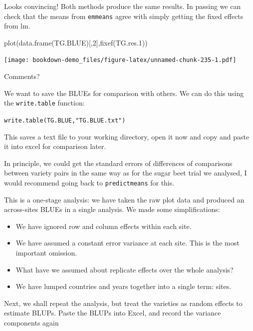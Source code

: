 \documentclass[
]{book}
\newenvironment{Shaded}{\begin{snugshade}}{\end{snugshade}}
\newcommand{\DecValTok}[1]{\textcolor[rgb]{0.00,0.00,0.81}{#1}}
\newcommand{\FloatTok}[1]{\textcolor[rgb]{0.00,0.00,0.81}{#1}}
\newcommand{\FunctionTok}[1]{\textcolor[rgb]{0.00,0.00,0.00}{#1}}
\newcommand{\NormalTok}[1]{#1}
\begin{document}
Looks convincing! Both methods produce the same results. In passing we can check that the means from \texttt{emmeans} agree with simply getting the fixed effects from lm.

\begin{Shaded}
\begin{Highlighting}[]
\FunctionTok{plot}\NormalTok{(}\FunctionTok{data.frame}\NormalTok{(TG.BLUE)[,}\DecValTok{2}\NormalTok{],}\FunctionTok{fixef}\NormalTok{(TG.res}\FloatTok{.1}\NormalTok{))}
\end{Highlighting}
\end{Shaded}

\texttt{[image: bookdown-demo\_files/figure-latex/unnamed-chunk-235-1.pdf]}

Comments?

We want to save the BLUEs for comparison with others. We can do this using the \texttt{write.table} function:

\texttt{write.table(TG.BLUE,"TG.BLUE.txt")}

This saves a text file to your working directory, open it now and copy and paste it into excel for comparison later.

In principle, we could get the standard errors of differences of comparisons between variety pairs in the same way as for the sugar beet trial we analysed, I would recommend going back to \texttt{predictmeans} for this.

This is a one-stage analysis: we have taken the raw plot data and produced an across-sites BLUEs in a single analysis. We made some simplifications:

\begin{itemize}
\item
  We have ignored row and column effects within each site.
\item
  We have assumed a constant error variance at each site. This is the most important omission.
\item
  What have we assumed about replicate effects over the whole analysis?
\item
  We have lumped countries and years together into a single term: sites.
\end{itemize}

Next, we shall repeat the analysis, but treat the varieties as random effects to estimate BLUPs. Paste the BLUPs into Excel, and record the variance components again
\end{document}
